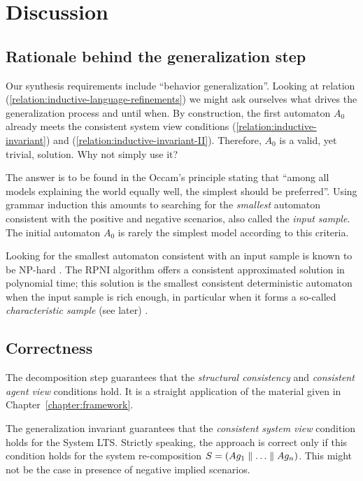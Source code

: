 \section{Discussion\label{section:inductive-discussion}}

\subsection{Rationale behind the generalization step}

Our synthesis requirements include ``behavior generalization''. Looking at relation (\ref{relation:inductive-language-refinements}) we might ask ourselves what drives the generalization process and until when. By construction, the first automaton $A_0$ already meets the consistent system view conditions (\ref{relation:inductive-invariant}) and (\ref{relation:inductive-invariant-II}). Therefore, $A_0$ is a valid, yet trivial, solution. Why not simply use it?

The answer is to be found in the Occam's principle stating that ``among all models explaining the world equally well, the simplest should be preferred''. Using grammar induction this amounts to searching for the \emph{smallest} automaton consistent with the positive and negative scenarios, also called the \emph{input sample}. The initial automaton $A_0$ is rarely the simplest model according to this criteria. 

Looking for the smallest automaton consistent with an input sample is known to be NP-hard \cite{Gold:1978, Angluin:1978}. The RPNI algorithm offers a consistent approximated solution in polynomial time; this solution is the smallest consistent deterministic automaton when the input sample is rich enough, in particular when it forms a so-called \emph{characteristic sample} (see later) \cite{Oncina:1992}.

\subsection{Correctness}

The decomposition step guarantees that the \emph{structural consistency} and \emph{consistent agent view} conditions hold. It is a straight application of the material given in Chapter~\ref{chapter:framework}. 

The generalization invariant guarantees that the \emph{consistent system view} condition holds for the System LTS. Strictly speaking, the approach is correct only if this condition holds for the system re-composition $S = (Ag_1 \parallel \ldots \parallel Ag_n)$. This might not be the case in presence of negative implied scenarios.

